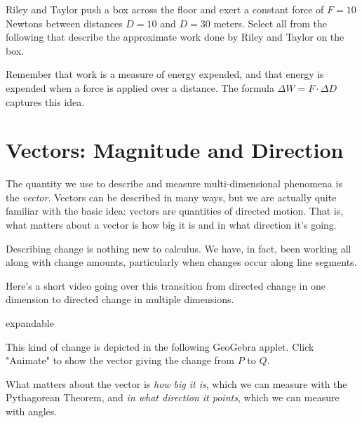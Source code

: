 \documentclass{ximera}
\begin{document}
\begin{problem}
Riley and Taylor push a box across the floor and exert a constant force of $F=10$ Newtons between distances $D=10$ and $D=30$ meters. Select all from the following that describe the approximate work done by Riley and Taylor on the box.

\begin{selectAll}
\end{selectAll}
\begin{feedback}
Remember that work is a measure of energy expended, and that energy is expended when a force is applied over a distance. The formula $\Delta W=F\cdot \Delta D$ captures this idea.
\end{feedback}
\end{problem}


\section{Vectors: Magnitude and Direction}

The quantity we use to describe and measure multi-dimensional phenomena is the \emph{vector}. Vectors can be described in many ways, but we are actually quite familiar with the basic idea: vectors are quantities of directed motion. That is, what matters about a vector is how big it is and in what direction it's going.

Describing change is nothing new to calculus. We have, in fact, been working all along with change amounts, particularly when changes occur along line segments. 

Here's a short video going over this transition from directed change in one dimension to directed change in multiple dimensions.

\begin{expandable}
    expandable
\end{expandable}

This kind of change is depicted in the following GeoGebra applet. Click "Animate" to show the vector giving the change from $P$ to $Q$.

\begin{center}
\end{center}

What matters about the vector is \emph{how big it is}, which we can measure with the Pythagorean Theorem, and \emph{in what direction it points}, which we can measure with angles.
\end{document}
